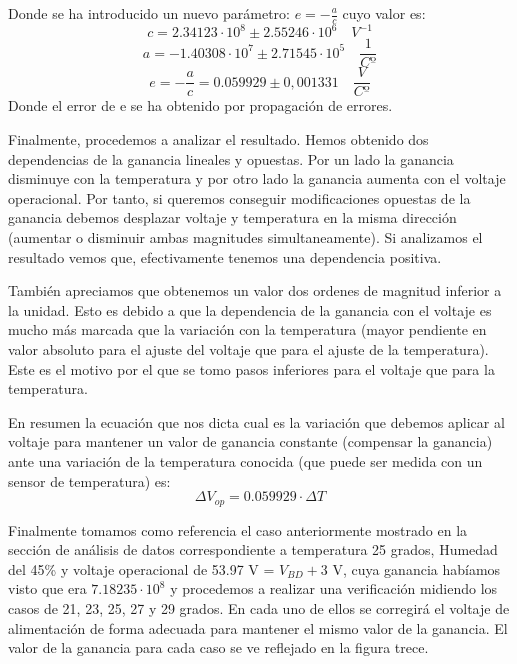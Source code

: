 Donde se ha introducido un nuevo parámetro: $e=-\frac{a}{c}$ cuyo valor es:
$$c=2.34123 \cdot 10^8 \pm 2.55246 \cdot 10^6 \quad V^{-1}$$
$$a=-1.40308 \cdot 10^7 \pm 2.71545 \cdot 10^5 \quad \frac{1}{Cº}$$
$$e=-\frac{a}{c} = 0.059929 \pm 0,001331 \quad \frac{V}{Cº}$$
Donde el error de e se ha obtenido por propagación de errores. 

Finalmente, procedemos a analizar el resultado. Hemos obtenido dos dependencias de la ganancia lineales y opuestas. Por un lado la ganancia disminuye con la temperatura y por otro lado la ganancia aumenta con el voltaje operacional. Por tanto, si queremos conseguir modificaciones opuestas de la ganancia debemos desplazar voltaje y temperatura en la misma dirección (aumentar o disminuir ambas magnitudes simultaneamente). Si analizamos el resultado vemos que, efectivamente tenemos una dependencia positiva.

También apreciamos que obtenemos un valor dos ordenes de magnitud inferior a la unidad. Esto es debido a que la dependencia de la ganancia con el voltaje es mucho más marcada que la variación con la temperatura (mayor pendiente en valor absoluto para el ajuste del voltaje que para el ajuste de la temperatura). Este es el motivo por el que se tomo pasos inferiores para el voltaje que para la temperatura. 

En resumen la ecuación que nos dicta cual es la variación que debemos aplicar al voltaje para mantener un valor de ganancia constante (compensar la ganancia) ante una variación de la temperatura conocida (que puede ser medida con un sensor de temperatura) es:
$$\Delta V_{op}=0.059929 \cdot \Delta T$$

Finalmente tomamos como referencia el caso anteriormente mostrado en la sección de análisis de datos correspondiente a temperatura 25 grados, Humedad del 45\% y voltaje operacional de 53.97 V = $V_{BD}+ 3$ V, cuya ganancia habíamos visto que era $7.18235 \cdot 10^8$ y procedemos a realizar una verificación midiendo los casos de 21, 23, 25, 27 y 29 grados. En cada uno de ellos se corregirá el voltaje de alimentación de forma adecuada para mantener el mismo valor de la ganancia. El valor de la ganancia para cada caso se ve reflejado en la figura trece. 

